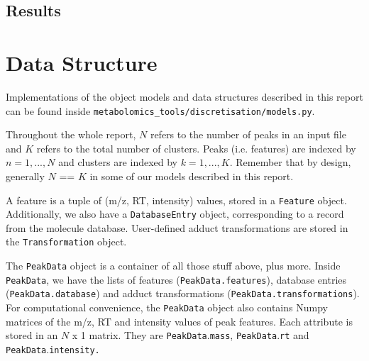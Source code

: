 \documentclass[12pt,a4paper]{article}
\begin{document}
\subsection{Results}

\section{Data Structure}
\label{sec:data_structure}

Implementations of the object models and data structures described in this report can be found inside \texttt{\small{}metabolomics\_tools/discretisation/models.py}. 

Throughout the whole report, $N$ refers to the number of peaks in an input file and $K$ refers to the total number of clusters. Peaks (i.e. features) are indexed by $n=1,...,N$ and clusters are indexed by $k=1,...,K$. Remember that by design, generally $N$ == $K$ in some of our models described in this report.

A feature is a tuple of (m/z, RT, intensity) values, stored in a \texttt{\small{}Feature} object. Additionally, we also have a \texttt{\small{}DatabaseEntry} object, corresponding to a record from the molecule database. User-defined adduct transformations are stored in the \texttt{\small{}Transformation} object.

The \texttt{\small{}PeakData} object is a container of all those stuff above, plus more. Inside \texttt{\small{}PeakData}, we have the lists of features (\texttt{\small{}PeakData.features}), database entries (\texttt{\small{}PeakData.database}) and adduct transformations (\texttt{\small{}PeakData.transformations}). For computational convenience, the \texttt{\small{}PeakData} object also contains Numpy matrices of the m/z, RT and intensity values of peak features. Each attribute is stored in an $N$ x 1 matrix. They are \texttt{\small{}PeakData}.\texttt{\small{}mass}, \texttt{\small{}PeakData}.\texttt{\small{}rt} and \texttt{\small{}PeakData}.\texttt{\small{}intensity.}{\small \par}
\end{document}
